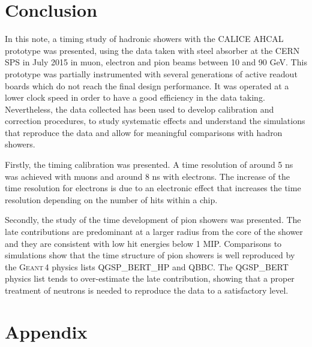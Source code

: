 \documentclass{JINST}
\newcommand\geant{\textsc{Geant\,4}\xspace}
\begin{document}
\section{Conclusion}

In this note, a timing study of hadronic showers with the CALICE AHCAL prototype was presented, using the data taken with steel absorber at the CERN SPS in July 2015 in muon, electron and pion beams between 10 and 90 GeV. This prototype was partially instrumented with several generations of active readout boards which do not reach the final design performance. It was operated at a lower clock speed in order to have a good efficiency in the data taking. Nevertheless, the data collected has been used to develop calibration and correction procedures, to study systematic effects and understand the simulations that reproduce the data and allow for meaningful comparisons with hadron showers.

Firstly, the timing calibration was presented. A time resolution of around 5 ns was achieved with muons and around 8 ns with electrons. The increase of the time resolution for electrons is due to an electronic effect that increases the time resolution depending on the number of hits within a chip.

Secondly, the study of the time development of pion showers was presented. The late contributions are predominant at a larger radius from the core of the shower and they are consistent with low hit energies below 1 MIP. Comparisons to simulations show that the time structure of pion showers is well reproduced by the \geant physics lists QGSP\_BERT\_HP and QBBC. The QGSP\_BERT physics list tends to over-estimate the late contribution, showing that a proper treatment of neutrons is needed to reproduce the data to a satisfactory level.




% 

\clearpage

\appendix
\section{Appendix}
\label{appendix:Additional}
\setcounter{table}{0}
\renewcommand{\thetable}{A\arabic{table}}
\end{document}
